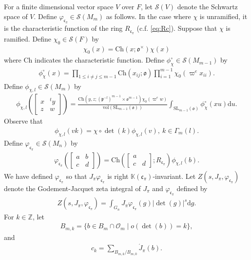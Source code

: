 \documentclass[11pt]{amsart}
\newcommand\Vp{\varpi}%
\newcommand\vp{\varphi}%
\newcommand\oo{\mathfrak{o}}
\newcommand\p{{\mathfrak{p}}}
\newcommand\cf{{\mathfrak{c}}}
\newcommand\dr{\mathrm{d}}
\newcommand\Z{{\mathbb{Z}}}
\newcommand\K{{\mathbb{K}}}
\newcommand\Ss{{\mathscr{S}}}
\newcommand\Oc{{\mathcal{O}}}
\newcommand\1{\mathbf{1}}
\newcommand\ac{\acute}
\newcommand\SL{{\mathrm{SL}}}
\newcommand\tm{\times}
\newcommand\Ch{{\mathrm{Ch}}}%
\newcommand\vol{{\mathrm{vol}}}
\numberwithin{equation}{section}
\begin{document}
For a finite dimensional vector space $V$ over $F$, let $\Ss(V)$ denote the Schwartz space of $V$.
Define $\vp_{\cf_\pi} \in \Ss(M_m)$ as follows.
In the case where $\chi$ is unramified, it is the characteristic function of the ring $R_{\cf_\pi}$ (c.f. \ref{eq:Rc}).
Suppose that $\chi$ is ramified.
Define $\chi_0 \in \Ss(F)$ by 
\begin{align*}
\chi_0(x) = \Ch(x;\oo^\tm) \chi(x)
\end{align*} 
where $\Ch$ indicates the characteristic function.
Define $\phi_\chi^\circ \in \Ss(M_{m-1})$ by
\begin{align*}
\phi_\chi^\circ(x) = \prod_{1 \le i \neq j \le m-1}\Ch(x_{ij};\oo) \prod_{i=1}^{m-1} \chi_0(\Vp^e x_{ii}).
\end{align*} 
Define $\phi_{\chi,l} \in \Ss(M_{m})$ by
\begin{align*}
\phi_{\chi,l}(\begin{bmatrix}
x & {}^t y \\
z & w
\end{bmatrix}) = \frac{\Ch(y, z; (\p^{-l})^{m-1} \tm \oo^{m-1}) \chi_0(\Vp^e w)}{\vol(\SL_{m-1}(\oo))}\int_{\SL_{m-1}(\oo)}\phi_\chi^\circ(x  u) \dr u. 
\end{align*} 
Observe that 
\begin{align}
\phi_{\chi,l}(vk) = \chi \circ \det(k) \phi_{\chi,l}(v), \  k \in \Gamma_m(l). \label{eq:phchl}
\end{align} 
Define $\vp_{\cf_\pi} \in \Ss(M_n)$ by 
\begin{align*}
\vp_{\cf_\pi}(\begin{bmatrix}
a &b  \\
c& d
\end{bmatrix}) = \Ch(\begin{bmatrix}
a &  \\
c& d
\end{bmatrix}; R_{\cf_\pi}) \phi_{\chi,l}(b).
\end{align*} 
We have defined $\vp_{\cf_\pi}$ so that $J_\pi \vp_{\cf_\pi}$ is right $\K(\cf_\pi)$-invariant.
Let $Z(s,J_\pi, \vp_{\cf_\pi})$ denote the Godement-Jacquet zeta integral of $J_\pi$ and $\vp_{\cf_\pi}$ defined by
\begin{align*}
Z(s,J_\pi, \vp_{\cf_\pi}) = \int_{G_n} J_\pi \vp_{\cf_\pi}(g) |\det(g)|^s \dr g.
\end{align*} 
For $k \in \Z$, let 
\begin{align*}
B_{m,k}= \{b \in B_m \cap \Oc_m \mid o(\det(b)) = k \},
\end{align*} 
and 
\begin{align*}
c_k = \sum_{B_{m,k}/B_{m,0}} \ac{J}_\pi(b).
\end{align*} 
\end{document}
